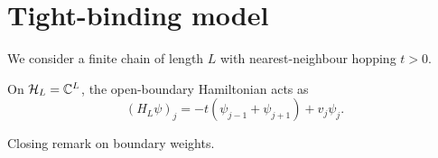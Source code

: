 \section{Tight-binding model}\label{sec:model}
We consider a finite chain of length $L$ with nearest-neighbour hopping $t>0$.
\begin{defn}\label{def:ham}
On $\mathcal{H}_L = \mathbb{C}^L$, the open-boundary Hamiltonian acts as
\begin{equation}\label{eq:ham}
(H_L \psi)_j = -t(\psi_{j-1} + \psi_{j+1}) + v_j \psi_j.
\end{equation}
\end{defn}

Closing remark on boundary weights.
